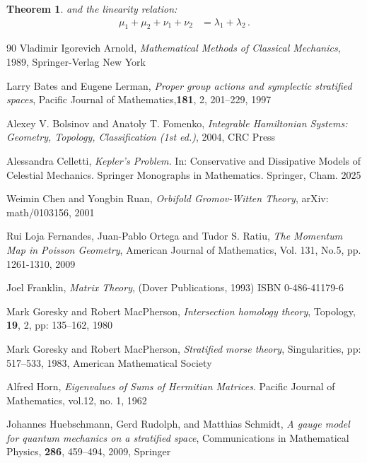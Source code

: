 \documentclass[12pt]{amsart}
\newtheorem{theorem}{Theorem}[section]
\theoremstyle{definition}
\numberwithin{equation}{section}
\begin{document}
{\begin{theorem}
   and the linearity relation:
  \begin{align*} 
\mu_1 + \mu_2   + \nu_1 + \nu_2   &= \lambda_1 + \lambda_2  \,.
\end{align*}
     
\end{theorem}

\begin{thebibliography}{90}
 Vladimir Igorevich Arnold, {\it Mathematical Methods of Classical Mechanics}, 1989, Springer-Verlag New York

 Larry Bates  and Eugene Lerman, {\it Proper group actions and symplectic stratified spaces}, Pacific Journal of Mathematics,{\bf 181}, 2, 201--229, 1997



Alexey V. Bolsinov and  Anatoly T. Fomenko,   {\it Integrable Hamiltonian Systems: Geometry, Topology, Classification  (1st ed.)}, 2004, CRC Press

  Alessandra Celletti,    {\it  Kepler's Problem.} In: Conservative and Dissipative Models of Celestial Mechanics. Springer Monographs in Mathematics. Springer, Cham. 2025
    
    

  Weimin Chen and   Yongbin Ruan,
	{\it Orbifold Gromov-Witten Theory}, arXiv: math/0103156, 2001


Rui Loja Fernandes, Juan-Pablo Ortega and Tudor S. Ratiu, {\it{The Momentum Map in Poisson Geometry}}, American Journal of Mathematics,
Vol. 131, No.5, pp. 1261-1310, 2009


 Joel Franklin,    {\it Matrix Theory}, (Dover Publications, 1993) ISBN 0-486-41179-6


Mark Goresky    and Robert   MacPherson,   {\it Intersection homology theory}, Topology, {\bf 19}, 2, pp: 135--162, 1980

 Mark Goresky  and Robert  MacPherson,   {\it Stratified morse theory}, Singularities, pp: 517--533, 1983, American Mathematical Society


Alfred Horn,   {\it Eigenvalues of Sums of Hermitian Matrices}. Pacific Journal of
Mathematics, vol.12, no. 1, 1962
	


 Johannes   Huebschmann,  Gerd Rudolph, and Matthias Schmidt, {\it A gauge model for quantum mechanics on a stratified space}, Communications in Mathematical Physics, {\bf 286}, 459--494, 2009, Springer


\end{thebibliography}}
\end{document}
